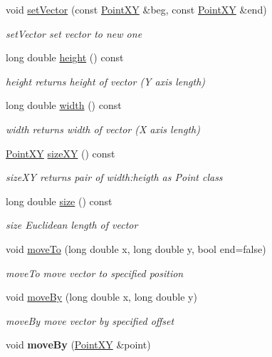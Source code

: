 \begin{DoxyCompactItemize}
\item 
void \hyperlink{classVectorXY_a8ba83cb02ebe32672926abac17ab174e}{set\+Vector} (const \hyperlink{classPointXY}{Point\+X\+Y} \&beg, const \hyperlink{classPointXY}{Point\+X\+Y} \&end)
\begin{DoxyCompactList}\small\item\em set\+Vector set vector to new one \end{DoxyCompactList}\item 
long double \hyperlink{classVectorXY_adb8b4da2bd2d7383af3973d6daa95b53}{height} () const 
\begin{DoxyCompactList}\small\item\em height returns height of vector (Y axis length) \end{DoxyCompactList}\item 
long double \hyperlink{classVectorXY_ada8c272d3a9f8aab0b6af4cd15763d23}{width} () const 
\begin{DoxyCompactList}\small\item\em width returns width of vector (X axis length) \end{DoxyCompactList}\item 
\hyperlink{classPointXY}{Point\+X\+Y} \hyperlink{classVectorXY_a0f1457e18bad227f3e06b5b3ca37f0b7}{size\+X\+Y} () const 
\begin{DoxyCompactList}\small\item\em size\+X\+Y returns pair of width\+:heigth as Point class \end{DoxyCompactList}\item 
long double \hyperlink{classVectorXY_aa7aa129411aaeb43a1b89084c2af5da8}{size} () const 
\begin{DoxyCompactList}\small\item\em size Euclidean length of vector \end{DoxyCompactList}\item 
void \hyperlink{classVectorXY_a85281070287140c27325ad11e7198840}{move\+To} (long double x, long double y, bool end=false)
\begin{DoxyCompactList}\small\item\em move\+To move vector to specified position \end{DoxyCompactList}\item 
void \hyperlink{classVectorXY_a27649ddf218ed91b6c38e9ccee45a637}{move\+By} (long double x, long double y)
\begin{DoxyCompactList}\small\item\em move\+By move vector by specified offset \end{DoxyCompactList}\item 
\hypertarget{classVectorXY_a10fb6ca1d0a636852eff2f753b619ac8}{}void {\bfseries move\+By} (\hyperlink{classPointXY}{Point\+X\+Y} \&point)\label{classVectorXY_a10fb6ca1d0a636852eff2f753b619ac8}


\end{DoxyCompactItemize}
